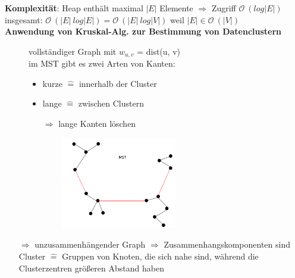 \documentclass[11pt, fleqn]{scrreprt}
\newcommand{\bigO}[0]{\mathcal{O}}
\begin{document}
    \textbf{Komplexität}: Heap enthält maximal $|E|$ Elemente $\Rightarrow$ Zugriff $\bigO{}\ (log|E|)$\\
    insgesamt: $\bigO{}\ (|E|\ log|E|) = \bigO{}\ (|E| \ log |V|)$ weil $|E| \in \bigO{}\ (|V|)$\\

    \textbf{Anwendung von Kruskal-Alg. zur Bestimmung von Datenclustern}\\
    \begin{figure}[htbp]
        \begin{minipage}{8cm}
            \vspace*{0mm}
            vollständiger Graph mit $w_{u,v}$ = dist(u, v)\\

            im MST gibt es zwei Arten von Kanten:
            \begin{itemize}
                \item kurze $\widehat{=}$ innerhalb der Cluster
                \item lange $\widehat{=}$ zwischen Clustern
                \item[$\Rightarrow$] lange Kanten löschen
            \end{itemize}
        \end{minipage}
        \begin{minipage}{8cm}
            \includegraphics[width=8cm,height=4cm,keepaspectratio]{./Pictures/Sternbild.png}
        \end{minipage}
    \end{figure}
    \begin{itemize}
        \item[$\Rightarrow$] unzusammenhängender Graph $\Rightarrow$ Zusammenhangskomponenten sind Cluster $\widehat{=}$ Gruppen von Knoten, die sich nahe sind, während die Clusterzentren größeren Abstand haben
    \end{itemize}
\end{document}
